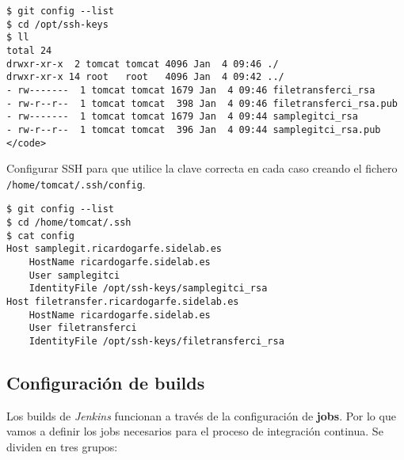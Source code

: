 \lstset{style=bashbasico}
\begin{lstlisting}[frame=trbl]
$ git config --list
$ cd /opt/ssh-keys
$ ll
total 24
drwxr-xr-x  2 tomcat tomcat 4096 Jan  4 09:46 ./
drwxr-xr-x 14 root   root   4096 Jan  4 09:42 ../
- rw-------  1 tomcat tomcat 1679 Jan  4 09:46 filetransferci_rsa
- rw-r--r--  1 tomcat tomcat  398 Jan  4 09:46 filetransferci_rsa.pub
- rw-------  1 tomcat tomcat 1679 Jan  4 09:44 samplegitci_rsa
- rw-r--r--  1 tomcat tomcat  396 Jan  4 09:44 samplegitci_rsa.pub
</code>
\end{lstlisting}

\par Configurar SSH para que utilice la clave correcta en cada caso creando el fichero \texttt{/home/tomcat/.ssh/config}.

\lstset{style=bashbasico}
\begin{lstlisting}[frame=trbl]
$ git config --list
$ cd /home/tomcat/.ssh
$ cat config
Host samplegit.ricardogarfe.sidelab.es
    HostName ricardogarfe.sidelab.es
    User samplegitci
    IdentityFile /opt/ssh-keys/samplegitci_rsa
Host filetransfer.ricardogarfe.sidelab.es
    HostName ricardogarfe.sidelab.es
    User filetransferci
    IdentityFile /opt/ssh-keys/filetransferci_rsa
\end{lstlisting}

\subsection{Configuración de builds}
\label{sub:jenkins-build-jobs}

\par Los builds de \emph{Jenkins} funcionan a través de la configuración de \textbf{jobs}. Por lo que vamos a definir los jobs necesarios para el proceso de integración continua. Se dividen en tres grupos:


